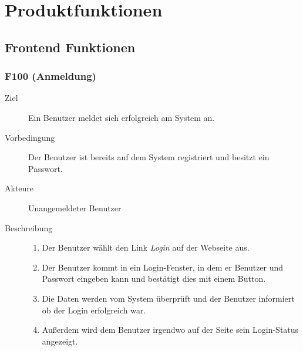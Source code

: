 
\chapter{Produktfunktionen}

\section{Frontend Funktionen}
\subsection{F100 (Anmeldung)}
\label{F:Anmeldung}
\begin{description}
  \item[Ziel]Ein Benutzer meldet sich erfolgreich am System an.
  \item[Vorbedingung]Der Benutzer ist bereits auf dem System registriert und besitzt ein Passwort.
  \item[Akteure]Unangemeldeter Benutzer
   \item[Beschreibung]\hfill
    \begin{enumerate}
      \item Der Benutzer wählt den Link \emph{Login} auf der Webseite aus.
	  \item Der Benutzer kommt in ein Login-Fenster, in dem er Benutzer und
		Passwort eingeben kann und bestätigt dies mit einem Button.
	  \item Die Daten werden vom System überprüft und der Benutzer informiert
		ob der Login erfolgreich war.
	  \item Außerdem wird dem Benutzer irgendwo auf der Seite sein Login-Status
		angezeigt.
    \end{enumerate}
\end{description}

